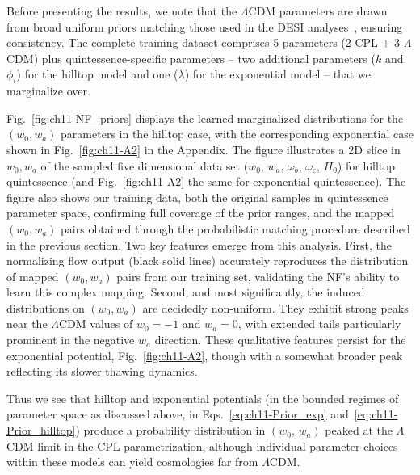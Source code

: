 Before presenting the results, we note that the $\Lambda$CDM parameters are drawn from broad uniform priors matching those used in the DESI analyses~\cite{DESI:2025zgx,DESI:2025fii}, ensuring consistency. The complete training dataset comprises 5 parameters (2 CPL + 3 $\Lambda$CDM) plus quintessence-specific parameters -- two additional parameters ($k$ and $\phi_i$) for the hilltop model and one ($\lambda$) for the exponential model -- that we marginalize over.


Fig.~\ref{fig:ch11-NF_priors} displays the learned marginalized distributions for the  $(w_0, w_a)$ parameters in the hilltop case, with the corresponding exponential case shown in Fig.~\ref{fig:ch11-A2} in the Appendix.  The figure illustrates a 2D slice in $w_0, w_a$ of the sampled five dimensional data set ($w_0$, $w_a$, $\omega_b$, $\omega_c$, $H_0$) for hilltop quintessence (and Fig.~\ref{fig:ch11-A2} the same for exponential quintessence).
The figure also shows our training data, both the original samples in quintessence parameter space, confirming full coverage of the prior ranges, and the mapped $(w_0, w_a)$ pairs obtained through the probabilistic matching procedure described in the previous section. Two key features emerge from this analysis. First, the normalizing flow output (black solid lines) accurately reproduces the distribution of mapped $(w_0, w_a)$ pairs from our training set, validating the NF's ability to learn this complex mapping. Second, and most significantly, the induced distributions on $(w_0, w_a)$ are decidedly non-uniform. They exhibit strong peaks near the $\Lambda$CDM values of $w_0= -1$ and $w_a = 0$, with extended tails particularly prominent in the negative $w_a$ direction. These qualitative features persist for the exponential potential, Fig.~\ref{fig:ch11-A2}, though with a somewhat broader peak reflecting its slower thawing dynamics.

Thus we see that hilltop and exponential potentials (in the bounded regimes of parameter space as discussed above, in Eqs.~\eqref{eq:ch11-Prior_exp} and~\eqref{eq:ch11-Prior_hilltop}) produce a probability distribution in $(w_0,\, w_a)$ peaked at the $\Lambda$CDM limit in the CPL parametrization, although individual parameter choices within these models can yield cosmologies far from $\Lambda$CDM.

